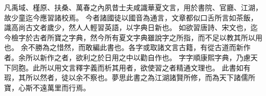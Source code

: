 凡禹域、槿原、扶桑、萬春之內夙昔士夫咸識華夏文言，用於書院、官廳、江湖，故少童迄今應習諸校焉。
今者諸國徒以國音為通言，文章都似口舌所言如茶飯，識高尚古文者歲少，然人人輕習英語，以字典日新也。
如欲習唐詩、宋文也，迄今檢字於古者所寶之字典，然今所有夏文字典雖說字之所指，而不足以教其所以用也。
余不勝為之惜然，而敢編此書也。各字或取諸文言古籍，有從古道而新作者。余所以新作之者，欲利之於日用之中以勸自作也。
字字順康熙字典，乃慮天下同胞。此所以用文言釋字義而析其用者，欲使習之者精通文理也。
此書如有瑕，其所以然者，徒以余不察也。夢思此書之為江湖諸賢所修，而為天下諸儒所寶，心斯不遠萬里而行焉。
